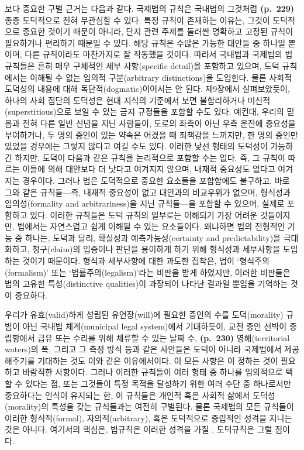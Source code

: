 보다 중요한 구별 근거는 다음과 같다. 국제법의 규칙은 국내법의 그것처럼
\textbf{(p.~229)} 종종 도덕적으로 전혀 무관심할 수 있다. 특정 규칙이
존재하는 이유는, 그것이 도덕적으로 중요한 것이기 때문이 아니라, 단지
관련 주제를 둘러싼 명확하고 고정된 규칙이 필요하거나 편리하기 때문일 수
있다. 해당 규칙은 수많은 가능한 대안들 중 하나일 뿐이며, 다른 규칙이라도
마찬가지로 잘 작동했을 것이다. 따라서 국내법과 국제법의 법규칙들은 흔히
매우 구체적인 세부 사항(specific detail)을 포함하고 있으며, 도덕
규칙에서는 이해될 수 없는 임의적 구분(arbitrary distinctions)을
도입한다. 물론 사회적 도덕성의 내용에 대해 독단적(dogmatic)이어서는 안
된다. 제9장에서 살펴보았듯이, 하나의 사회 집단의 도덕성은 현대 지식의
기준에서 보면 불합리하거나 미신적(superstitious)으로 보일 수 있는 금지
규정들을 포함할 수도 있다. 예컨대, 우리의 믿음과 전혀 다른 일반 신념을
지닌 사람들이, 도로의 좌측이 아닌 우측 운전에 
중요성을 부여하거나, 두 명의 증인이 있는 약속은 어겼을 때 죄책감을
느끼지만, 한 명의 증인만 있었을 경우에는 그렇지 않다고 여길 수도 있다.
이러한 낯선 형태의 도덕성이 가능하긴 하지만, 도덕이 다음과 같은 규칙을
논리적으로 포함할 수는 없다. 즉, 그 규칙이 따르는 이들에 의해 대안보다
더 낫다고 여겨지지 않으며, 내재적 중요성도 없다고 여겨지는 경우이다.
그러나 법은 도덕적으로 중요한 요소들을 포함함에도 불구하고, 바로 그와
같은 규칙들---즉, 내재적 중요성이 없고 대안과의 비교우위가 없으며,
형식성과 임의성(formality and arbitrariness)을 지닌 규칙들---을 포함할
수 있으며, 실제로 포함하고 있다. 이러한 규칙들은 도덕 규칙의 일부로는
이해되기 가장 어려운 것들이지만, 법에서는 자연스럽고 쉽게 이해될 수 있는
요소들이다. 왜냐하면 법의 전형적인 기능 중 하나는, 도덕과 달리, 확실성과
예측가능성(certainty and predictability)을 극대화하고, 청구(claim)의
입증이나 판단을 용이하게 하기 위해 형식성과 세부사항을 도입하는 것이기
때문이다. 형식과 세부사항에 대한 과도한 집착은, 법이
`형식주의(formalism)' 또는 `법률주의(legalism)'라는 비판을 받게
하였지만, 이러한 비판들은 법의 고유한 특성(distinctive qualities)이
과장되어 나타난 결과일 뿐임을 기억하는 것이 중요하다.

우리가 유효(valid)하게 성립된 유언장(will)에 필요한 증인의 수를
도덕(morality) 규범이 아닌 국내법 체계(municipal legal system)에서
기대하듯이, 교전 중인 선박이 중립항에서 급유 또는 수리를 위해 체류할 수
있는 날짜 수, \textbf{(p.~230)} 영해(territorial waters)의 폭, 그리고 그
측정 방식 등과 같은 사안들은 도덕이 아니라 국제법에서 제공해주기를
기대하는 것도 이와 같은 이유에서이다. 이 모든 사항은 이 정하는 것이 필요하고 바람직한 사항이다. 그러나 이러한 규칙들이
여러 형태 중 하나를 임의적으로 택할 수 있다는 점, 또는 그것들이 특정
목적을 달성하기 위한 여러 수단 중 하나로서만 중요하다는 인식이 유지되는
한, 이 규칙들은 개인적 혹은 사회적 삶에서 도덕성(morality)의 특성을 갖는
규칙들과는 여전히 구별된다. 물론 국제법의 모든 규칙들이 이러한
형식적(formal), 자의적(arbitrary), 혹은 도덕적으로 중립적인 성격을
지니는 것은 아니다. 여기서의 핵심은, 법규칙은 이러한 성격을 가질
, 도덕규칙은 그럴  점이다.

